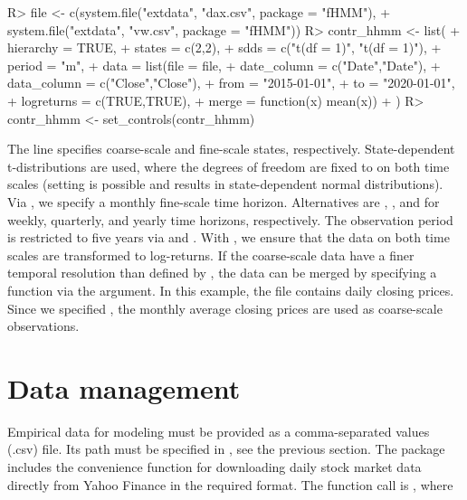 \documentclass[article,shortnames]{jss}
\newcommand{\fct}[1]{\code{#1()}}
\begin{document}
%
\begin{Schunk}
\begin{Sinput}
R> file <- c(system.file("extdata", "dax.csv", package = "fHMM"),
+            system.file("extdata", "vw.csv", package = "fHMM"))
R> contr_hhmm <- list(
+    hierarchy = TRUE,
+    states    = c(2,2),
+    sdds      = c("t(df = 1)", "t(df = 1)"),
+    period    = "m",
+    data      = list(file = file,
+                     date_column = c("Date","Date"),
+                     data_column = c("Close","Close"),
+                     from = "2015-01-01",
+                     to = "2020-01-01",
+                     logreturns = c(TRUE,TRUE),
+                     merge = function(x) mean(x))
+  )
R> contr_hhmm <- set_controls(contr_hhmm)
\end{Sinput}
\end{Schunk}
%

The line  specifies  coarse-scale and  fine-scale states, respectively. State-dependent t-distributions are used, where the degrees of freedom are fixed to  on both time scales (setting  is possible and results in state-dependent normal distributions). Via , we specify a monthly fine-scale time horizon. Alternatives are , , and  for weekly, quarterly, and yearly time horizons, respectively. The observation period is restricted to five years via  and . With , we ensure that the data on both time scales are transformed to log-returns. If the coarse-scale data have a finer temporal resolution than defined by , the data can be merged by specifying a function via the  argument. In this example, the file  contains daily closing prices. Since we specified , the monthly average closing prices are used as coarse-scale observations.

\section{Data management} \label{sec:data_management} %

Empirical data for modeling must be provided as a comma-separated values (.csv) file. Its path must be specified in \fct{set\_controls}, see the previous section. The package includes the convenience function \fct{download\_data} for downloading daily stock market data directly from Yahoo Finance in the required format. The function call is , where
\end{document}
